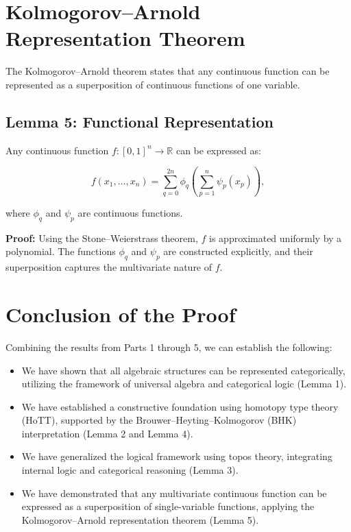 \documentclass{article}
\begin{document}
\section{Kolmogorov–Arnold Representation Theorem}

The Kolmogorov–Arnold theorem states that any continuous function can be represented as a superposition of continuous functions of one variable.

\subsection{Lemma 5: Functional Representation}
Any continuous function \( f: [0, 1]^n \rightarrow \mathbb{R} \) can be expressed as:

\[
f(x_1, \dots, x_n) = \sum_{q=0}^{2n} \phi_q\left(\sum_{p=1}^{n} \psi_p(x_p)\right),
\]

where \( \phi_q \) and \( \psi_p \) are continuous functions.

\textbf{Proof:} Using the Stone–Weierstrass theorem, \( f \) is approximated uniformly by a polynomial. The functions \( \phi_q \) and \( \psi_p \) are constructed explicitly, and their superposition captures the multivariate nature of \( f \).

\section{Conclusion of the Proof}

Combining the results from Parts 1 through 5, we can establish the following:

\begin{itemize}
    \item We have shown that all algebraic structures can be represented categorically, utilizing the framework of universal algebra and categorical logic (Lemma 1).
    \item We have established a constructive foundation using homotopy type theory (HoTT), supported by the Brouwer–Heyting–Kolmogorov (BHK) interpretation (Lemma 2 and Lemma 4).
    \item We have generalized the logical framework using topos theory, integrating internal logic and categorical reasoning (Lemma 3).
    \item We have demonstrated that any multivariate continuous function can be expressed as a superposition of single-variable functions, applying the Kolmogorov–Arnold representation theorem (Lemma 5).
\end{itemize}
\end{document}
